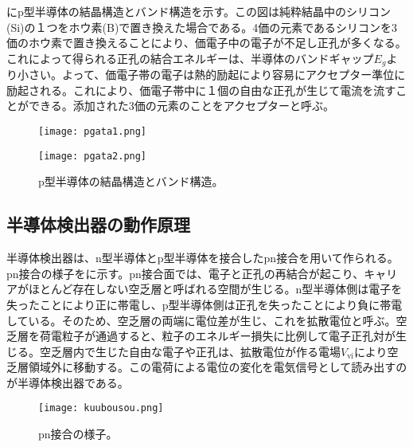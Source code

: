 にp型半導体の結晶構造とバンド構造を示す。この図は純粋結晶中のシリコン(Si)の１つをホウ素(B)で置き換えた場合である。4価の元素であるシリコンを3価のホウ素で置き換えることにより、価電子中の電子が不足し正孔が多くなる。これによって得られる正孔の結合エネルギーは、半導体のバンドギャップ$E_g$より小さい。よって、価電子帯の電子は熱的励起により容易にアクセプター準位に励起される。これにより、価電子帯中に１個の自由な正孔が生じて電流を流すことができる。添加された3価の元素のことをアクセプターと呼ぶ。
\begin{figure}[tbp]
  \begin{minipage}[b]{0.45\linewidth}
    \centering
    \texttt{[image: pgata1.png]}
  \end{minipage}
  \begin{minipage}[b]{0.45\linewidth}
    \centering
    \texttt{[image: pgata2.png]}
  \end{minipage}
  \caption[p型半導体の結晶構造とバンド構造]{p型半導体の結晶構造とバンド構造。}
  \label{fig:pgata}
\end{figure}


\subsection{半導体検出器の動作原理}
\label{sec:pnsetugou}

半導体検出器は、n型半導体とp型半導体を接合したpn接合を用いて作られる。pn接合の様子をに示す。pn接合面では、電子と正孔の再結合が起こり、キャリアがほとんど存在しない空乏層と呼ばれる空間が生じる。n型半導体側は電子を失ったことにより正に帯電し、p型半導体側は正孔を失ったことにより負に帯電している。そのため、空乏層の両端に電位差が生じ、これを拡散電位と呼ぶ。空乏層を荷電粒子が通過すると、粒子のエネルギー損失に比例して電子正孔対が生じる。空乏層内で生じた自由な電子や正孔は、拡散電位が作る電場$V_\mathrm{vi}$により空乏層領域外に移動する。この電荷による電位の変化を電気信号として読み出すのが半導体検出器である。

\begin{figure}[tbp]
  \centering
  \texttt{[image: kuubousou.png]}
  \caption[pn接合の様子]{pn接合の様子。}
  \label{fig:kuubousou}
\end{figure}

